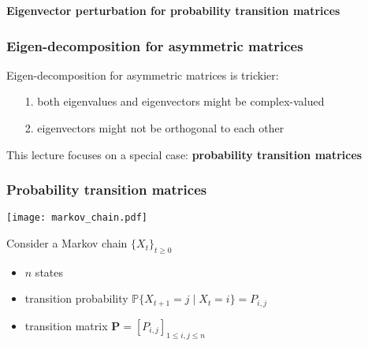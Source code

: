 \documentclass[compress,
mathserif,wide,%
]{beamer}
\begin{document}
\begin{frame}[plain]

\vfill
\begin{center}
  {\Large\bf Eigenvector perturbation for probability transition matrices}
\end{center}
\vfill

\end{frame}


\begin{frame}
	\frametitle{Eigen-decomposition for  asymmetric matrices}

	Eigen-decomposition for asymmetric matrices is trickier: 
	\begin{itemize}
		\itemsep0.5em
		\item[{\color{black}1.}]  both eigenvalues and eigenvectors might be complex-valued
		\item[{\color{black}2.}]  eigenvectors might not be orthogonal to each other
	\end{itemize}


	\vfill

	This lecture focuses on a special case:  {\bf probability transition matrices}

\end{frame}



\begin{frame}
	\frametitle{Probability transition matrices}

\vspace{-0.5em}
\begin{center}
	\texttt{[image: markov\_chain.pdf]}  
\end{center}

\vspace{-0.5em}
Consider a Markov chain $\{X_t\}_{t\geq 0}$ 

\begin{itemize}
	\itemsep0.5em
	\item $n$ states 
	\item transition probability $\mathbb{P}\{ X_{t+1}=j\mid X_t=i \} = P_{i,j}$
	\item transition matrix $\bm{P}=[P_{i,j}]_{1\leq i,j\leq n}$
\end{itemize}

\end{frame}
\end{document}

